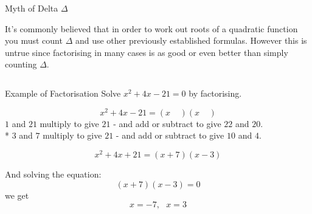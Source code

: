 \documentclass[final]{beamer}
\newlength{\onecolwid}
\newlength{\twocolwid}
\begin{document}
\begin{frame}[t]
\begin{columns}[t]
\begin{column}{\twocolwid}
\begin{columns}[t,totalwidth=\twocolwid]
\begin{column}{\onecolwid}

\end{column} %

\end{columns} %


\begin{alertblock}{Myth of Delta $\Delta$}

It's commonly believed that in order to work out roots of a quadratic function you must count $\Delta$ and use other previously established formulas. However this is untrue since factorising in many cases is as good or even better than simply counting $\Delta$.

\end{alertblock} 


\begin{columns}[t,totalwidth=\twocolwid] %

\begin{column}{\onecolwid} %


\begin{block}{Example of Factorisation}
Solve $x^2+4x-21=0$ by factorising.

$$x^2+4x-21=(x\ \ \ \ \ )(x\ \ \ \ \ )$$
$1$ and $21$ multiply to give $21$ - and add or subtract to give $22$ and $20$.\\*
$3$ and $7$ multiply to give $21$ - and add or subtract to give $10$ and \textbf{$4$}.

$$x^2+4x+21 = (x+7)(x-3)$$

And solving the equation:
$$(x+7)(x-3)=0$$
we get
$$x=-7,\ \ \ x=3$$

\end{block}


\end{column}
\end{columns}
\end{column}
\end{columns}
\end{frame}
\end{document}
